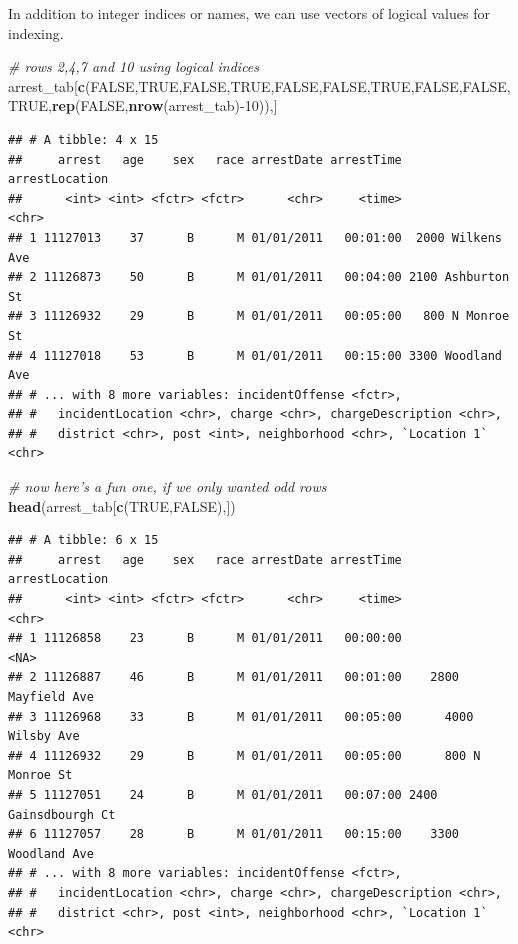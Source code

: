 \documentclass[]{article}
\newenvironment{Shaded}{\begin{snugshade}}{\end{snugshade}}
\newcommand{\KeywordTok}[1]{\textcolor[rgb]{0.13,0.29,0.53}{\textbf{{#1}}}}
\newcommand{\DecValTok}[1]{\textcolor[rgb]{0.00,0.00,0.81}{{#1}}}
\newcommand{\CommentTok}[1]{\textcolor[rgb]{0.56,0.35,0.01}{\textit{{#1}}}}
\newcommand{\OtherTok}[1]{\textcolor[rgb]{0.56,0.35,0.01}{{#1}}}
\newcommand{\NormalTok}[1]{{#1}}
\theoremstyle{definition}
\theoremstyle{definition}
\theoremstyle{remark}
\begin{document}
In addition to integer indices or names, we can use vectors of logical
values for indexing.

\begin{Shaded}
\begin{Highlighting}[]
\CommentTok{# rows 2,4,7 and 10 using logical indices}
\NormalTok{arrest_tab[}\KeywordTok{c}\NormalTok{(}\OtherTok{FALSE}\NormalTok{,}\OtherTok{TRUE}\NormalTok{,}\OtherTok{FALSE}\NormalTok{,}\OtherTok{TRUE}\NormalTok{,}\OtherTok{FALSE}\NormalTok{,}\OtherTok{FALSE}\NormalTok{,}\OtherTok{TRUE}\NormalTok{,}\OtherTok{FALSE}\NormalTok{,}\OtherTok{FALSE}\NormalTok{,}\OtherTok{TRUE}\NormalTok{,}\KeywordTok{rep}\NormalTok{(}\OtherTok{FALSE}\NormalTok{,}\KeywordTok{nrow}\NormalTok{(arrest_tab)-}\DecValTok{10}\NormalTok{)),]}
\end{Highlighting}
\end{Shaded}

\begin{verbatim}
## # A tibble: 4 x 15
##     arrest   age    sex   race arrestDate arrestTime    arrestLocation
##      <int> <int> <fctr> <fctr>      <chr>     <time>             <chr>
## 1 11127013    37      B      M 01/01/2011   00:01:00  2000 Wilkens Ave
## 2 11126873    50      B      M 01/01/2011   00:04:00 2100 Ashburton St
## 3 11126932    29      B      M 01/01/2011   00:05:00   800 N Monroe St
## 4 11127018    53      B      M 01/01/2011   00:15:00 3300 Woodland Ave
## # ... with 8 more variables: incidentOffense <fctr>,
## #   incidentLocation <chr>, charge <chr>, chargeDescription <chr>,
## #   district <chr>, post <int>, neighborhood <chr>, `Location 1` <chr>
\end{verbatim}

\begin{Shaded}
\begin{Highlighting}[]
\CommentTok{# now here's a fun one, if we only wanted odd rows}
\KeywordTok{head}\NormalTok{(arrest_tab[}\KeywordTok{c}\NormalTok{(}\OtherTok{TRUE}\NormalTok{,}\OtherTok{FALSE}\NormalTok{),])}
\end{Highlighting}
\end{Shaded}

\begin{verbatim}
## # A tibble: 6 x 15
##     arrest   age    sex   race arrestDate arrestTime       arrestLocation
##      <int> <int> <fctr> <fctr>      <chr>     <time>                <chr>
## 1 11126858    23      B      M 01/01/2011   00:00:00                 <NA>
## 2 11126887    46      B      M 01/01/2011   00:01:00    2800 Mayfield Ave
## 3 11126968    33      B      M 01/01/2011   00:05:00      4000 Wilsby Ave
## 4 11126932    29      B      M 01/01/2011   00:05:00      800 N Monroe St
## 5 11127051    24      B      M 01/01/2011   00:07:00 2400 Gainsdbourgh Ct
## 6 11127057    28      B      M 01/01/2011   00:15:00    3300 Woodland Ave
## # ... with 8 more variables: incidentOffense <fctr>,
## #   incidentLocation <chr>, charge <chr>, chargeDescription <chr>,
## #   district <chr>, post <int>, neighborhood <chr>, `Location 1` <chr>
\end{verbatim}
\end{document}
